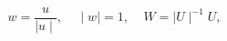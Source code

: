 \begin{equation}
w=\frac{u}{\mid u\mid},~~~~~\mid w \mid=1,~~~~~ W=\mid U \mid^{-1} U,
\end{equation}

